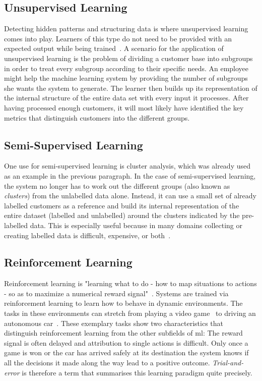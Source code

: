 \documentclass[
			   fontsize=11pt,
               paper=a4,
               bibliography=totoc,
               idxtotoc,
               headsepline,
               footsepline,
               footinclude=false,
               BCOR=12mm,
               DIV=13,
               openany,   %
               ]
               {scrbook}
\begin{document}
\subsection{Unsupervised Learning}
Detecting hidden patterns and structuring data is where unsupervised learning comes into play. Learners of this type do not need to be provided with an expected output while being trained~\cite{introUnsupervised}. A scenario for the application of unsupervised learning is the problem of dividing a customer base into subgroups in order to treat every subgroup according to their specific needs. An employee might help the machine learning system by providing the number of subgroups she wants the system to generate. The learner then builds up its representation of the internal structure of the entire data set with every input it processes. After having processed enough customers, it will most likely have identified the key metrics that distinguish customers into the different groups. 

\subsection{Semi-Supervised Learning}
One use for semi-supervised learning is cluster analysis, which was already used as an example in the previous paragraph. In the case of semi-supervised learning, the system no longer has to work out the different groups (also known as \textit{clusters}) from the unlabelled data alone. Instead, it can use a small set of already labelled customers as a reference and build its internal representation of the entire dataset (labelled and unlabelled) around the clusters indicated by the pre-labelled data. This is especially useful because in many domains collecting or creating labelled data is difficult, expensive, or both~\cite{introSemiSup}.

\subsection{Reinforcement Learning}

Reinforcement learning is "learning what to do - how to map situations to actions - so as to maximize a numerical reward signal"~\cite{introRL}. Systems are trained via reinforcement learning to learn how to behave in dynamic environments. The tasks in these environments can stretch from playing a video game~\cite{rlStarCraft} to driving an autonomous car~\cite{rlCars}. These exemplary tasks show two characteristics that distinguish reinforcement learning from the other subfields of \gls{ml}: The reward signal is often delayed and attribution to single actions is difficult. Only once a game is won or the car has arrived safely at its destination the system knows if all the decisions it made along the way lead to a positive outcome. \textit{Trial-and-error} is therefore a term that summarises this learning paradigm quite precisely.
\end{document}
